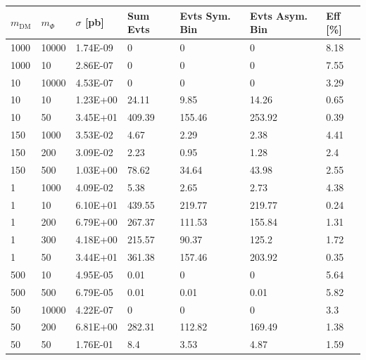 \begin{table}[h!]
\centering
\begin{tabular}{lllllll}
\hline
$m_\textrm{DM}$ & $m_\Phi$ & $\sigma$ [pb] & Sum Evts       & Evts Sym. Bin & Evts Asym. Bin & Eff  [\%]   \\\hline
1000  &  10000 & 1.74E-09 & 0      & 0      & 0      & 8.18 \\
1000  &  10    & 2.86E-07 & 0      & 0      & 0      & 7.55 \\
10  &  10000   & 4.53E-07 & 0      & 0      & 0      & 3.29 \\
10  &  10      & 1.23E+00 & 24.11  & 9.85   & 14.26  & 0.65 \\
10  &  50      & 3.45E+01 & 409.39 & 155.46 & 253.92 & 0.39 \\
150  &  1000   & 3.53E-02 & 4.67   & 2.29   & 2.38   & 4.41 \\
150  &  200    & 3.09E-02 & 2.23   & 0.95   & 1.28   & 2.4  \\
150  &  500    & 1.03E+00 & 78.62  & 34.64  & 43.98  & 2.55 \\
1  &  1000     & 4.09E-02 & 5.38   & 2.65   & 2.73   & 4.38 \\
1  &  10       & 6.10E+01 & 439.55 & 219.77 & 219.77 & 0.24 \\
1  &  200      & 6.79E+00 & 267.37 & 111.53 & 155.84 & 1.31 \\
1  &  300      & 4.18E+00 & 215.57 & 90.37  & 125.2  & 1.72 \\
1  &  50       & 3.44E+01 & 361.38 & 157.46 & 203.92 & 0.35 \\
500  &  10     & 4.95E-05 & 0.01   & 0      & 0      & 5.64 \\
500  &  500    & 6.79E-05 & 0.01   & 0.01   & 0.01   & 5.82 \\
50  &  10000   & 4.22E-07 & 0      & 0      & 0      & 3.3  \\
50  &  200     & 6.81E+00 & 282.31 & 112.82 & 169.49 & 1.38 \\
50  &  50      & 1.76E-01 & 8.4    & 3.53   & 4.87   & 1.59 \\

\end{tabular}
\end{table}
